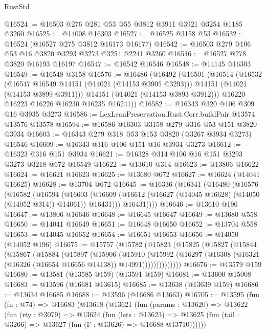 \begin{lexlean}{RustStd}
\begin{coremodule}
@16524 := @16503 @276 @281 @53 @55 @3812 @3911 @3921 @3254 @1185 @3260
@16525 := @14008 @16303
@16527 := @16525 @3158 @53
@16532 := @16524 (@16527 @275 @3812 @16173 @16177)
@16542 := @16503 @279 @106 @53 @16 @3820 @3293 @3273 @3254 @2241 @3260
@16546 := @16527 @278 @3820 @16193 @16197
@16547 := @16542 @16546
@16548 := @14145 @16303
@16549 := @16548 @3158
@16576 := @16486
    (@16492
      (@16501
        (@16514
          (@16532
            (@16547 @16549 @14151 (@14021 (@14153 @3905 @3293)))
            @14151
            (@14021 (@14153 @3899 @3911)))
          @14151
          (@14021 (@14153 @3893 @3912)))
        @16220
        @16223
        @16226
        @16230
        @16235
        @16241))
@16582 := @16343 @320 @106 @309 @16 @3935 @3273
@16586 := LexLeanPreservation.Rust.Corr.buildPair @13574 @13576 @13578
@16594 := @16586 @16303 @3158 @279 @316 @53 @151 @3820 @3934
@16603 := @16343 @279 @318 @53 @153 @3820 (@3267 @3934 @3273) @16546
@16609 := @16343 @316 @106 @151 @16 @3934 @3273
@16612 := @16323 @316 @151 @3934
@16621 := @16328 @314 @106 @16 @151 @3293 @3273 @3218 @672 @16549
@16622 := @13610 @314
@16623 := @13806 @16622
@16624 := @16621 @16623
@16625 := @13680 @672
@16627 := @16624 (@14041 @16625)
@16628 := @13704 @672
@16645 := @16336
    (@16341
      (@16480
        (@16576
          (@16582
            (@16594
              (@16603
                (@16609 (@16612 (@16627 (@14045 @16628) (@14050 (@14052 @314)) @14061)) @16431)))
            @16431))))
@16646 := @13610 @196
@16647 := @13806 @16646
@16648 := @16645 @16647
@16649 := @13680 @558
@16650 := @14041 @16649
@16651 := @16648 @16650
@16652 := @13704 @558
@16653 := @14045 @16652
@16654 := @16651 @16653
@16656 := @14050 (@14052 @196)
@16675 := @15757
    (@15782
      (@15823
        (@15825
          (@15827
            (@15844
              (@15867
                (@15884
                  (@15897
                    (@15906
                      (@15910
                        (@15992
                          (@16297
                            (@16308 (@16321 (@16326 (@16654 @16656 @14138)) @14991))))))))))))))
@16676 := @13579 @159
@16680 := @13581 (@13585 @159) (@13591 @159)
@16681 := @13600 @15008
@16683 := @13596 (@16681 @13615)
@16685 := @13638 (@13639 @159)
@16686 := @13634 @16685
@16688 := @13596 (@16686 @13663)
@16705 := @13595
    (fun (fn : @74) =>
    @16683
      (@13618
        (@13621
          (fun (params : @13620) =>
          @13622
            (fun (rty : @3079) =>
            @13624
              (fun (lets : @13623) =>
              @13625 (fun (tail : @3266) => @13627 (fun (Γ : @13626) => @16688 @13710))))))

\end{coremodule}
\end{lexlean}
